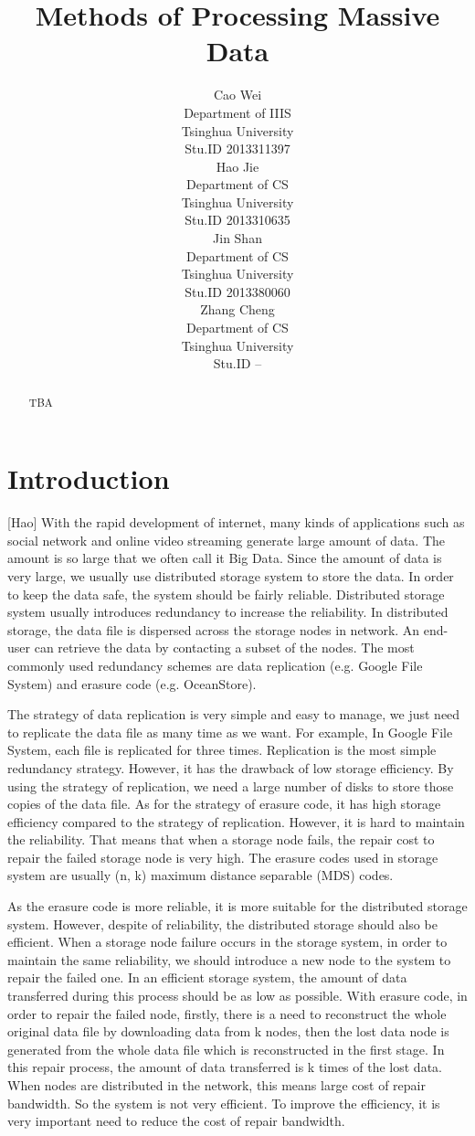 \documentclass{article} %
\title{Methods of Processing Massive Data}
\author{
Cao Wei \\
Department of IIIS\\
Tsinghua University\\
Stu.ID 2013311397 \\
\And
Hao Jie \\
Department of CS\\
Tsinghua University\\
Stu.ID 2013310635 \\
\And
Jin Shan \\
Department of CS\\
Tsinghua University\\
Stu.ID 2013380060 \\
\And
Zhang Cheng \\
Department of CS\\
Tsinghua University\\
Stu.ID -- \\
}
\begin{document}
\maketitle

\begin{abstract}
TBA
\end{abstract}

\section{Introduction}
[Hao] With the rapid development of internet, many kinds of applications such as social network and online video streaming generate large amount of data. The amount is so large that we often call it Big Data. Since the amount of data is very large, we usually use distributed storage system to store the data. In order to keep the data safe, the system should be fairly reliable. Distributed storage system usually introduces redundancy to increase the reliability. In distributed storage, the data file is dispersed across the storage nodes in network. An end-user can retrieve the data by contacting a subset of the nodes. The most commonly used redundancy schemes are data replication (e.g. Google File System) and erasure code (e.g. OceanStore).

The strategy of data replication is very simple and easy to manage, we just need to replicate the data file as many time as we want. For example, In Google File System, each file is replicated for three times. Replication is the most simple redundancy strategy. However, it has the drawback of low storage efficiency. By using the strategy of replication, we need a large number of disks to store those copies of the data file. As for the strategy of erasure code, it has high storage efficiency compared to the strategy of replication. However, it is hard to maintain the reliability. That means that when a storage node fails, the repair cost to repair the failed storage node is very high. The erasure codes used in storage system are usually (n, k) maximum distance separable (MDS) codes.

As the erasure code is more reliable, it is more suitable for the distributed storage system. However, despite of reliability, the distributed storage should also be efficient. When a storage node failure occurs in the storage system, in order to maintain the same reliability, we should introduce a new node to the system to repair the failed one. In an efficient storage system, the amount of data transferred during this process should be as low as possible. With erasure code, in order to repair the failed node, firstly, there is a need to reconstruct the whole original data file by downloading data from k nodes, then the lost data node is generated from the whole data file which is reconstructed in the first stage. In this repair process, the amount of data transferred is k times of the lost data. When nodes are distributed in the network, this means large cost of repair bandwidth. So the system is not very efficient. To improve the efficiency, it is very important need to reduce the cost of repair bandwidth.
      
\end{document}
